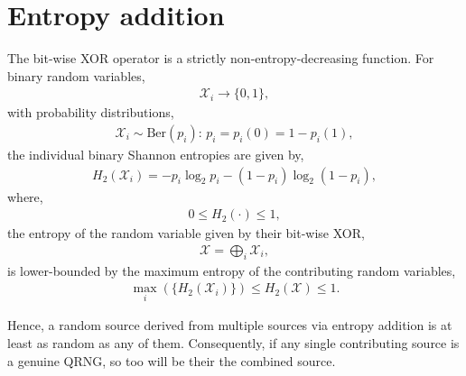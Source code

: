 %
%
%
%
%

\section{Entropy addition} \label{sec:entropy_add}

The bit-wise XOR operator is a strictly non-entropy-decreasing function. For binary random variables,
\begin{align}
	\mathcal{X}_i\to\{0,1\},
\end{align}
with probability distributions,
\begin{align}
	\mathcal{X}_i \sim \mathrm{Ber}(p_i):\, p_i=p_i(0)=1-p_i(1),
\end{align}
the individual binary Shannon entropies are given by,
\begin{align}
	H_2(\mathcal{X}_i) = -p_i\log_2 p_i - (1-p_i)\log_2(1-p_i),
\end{align}
where,
\begin{align}
	0 \leq H_2(\cdot) \leq 1,
\end{align}
the entropy of the random variable given by their bit-wise XOR,
\begin{align}
	\mathcal{X} = \bigoplus_i \mathcal{X}_i,
\end{align}
is lower-bounded by the maximum entropy of the contributing random variables,
\begin{align}
	\max_i(\{H_2(\mathcal{X}_i)\}) \leq H_2(\mathcal{X}) \leq 1.
\end{align}

Hence, a random source derived from multiple sources via entropy addition is at least as random as any of them. Consequently, if any single contributing source is a genuine QRNG, so too will be their the combined source.

